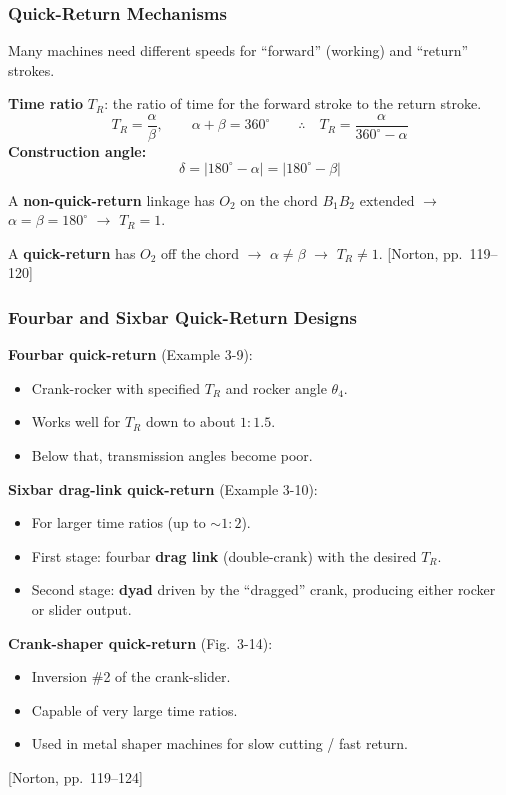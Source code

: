 \documentclass[10pt,aspectratio=43]{beamer}
\newcommand{\pref}[1]{\vfill\hfill{\scriptsize\color{gray}[Norton, pp.~#1]}}
\begin{document}

\begin{frame}
\frametitle{Quick-Return Mechanisms}

Many machines need different speeds for ``forward'' (working) and ``return'' strokes.

\begin{yellowbox}
\textbf{Time ratio} $T_R$: the ratio of time for the forward stroke to the return stroke.
\[
  T_R = \frac{\alpha}{\beta}, \qquad \alpha + \beta = 360^\circ \qquad \therefore\quad T_R = \frac{\alpha}{360^\circ - \alpha} \tag{3.1}
\]
\textbf{Construction angle:}
\[
  \delta = |180^\circ - \alpha| = |180^\circ - \beta| \tag{3.2}
\]
\end{yellowbox}

\vspace{4pt}
A \textbf{non-quick-return} linkage has $O_2$ on the chord $B_1B_2$ extended $\to$ $\alpha = \beta = 180^\circ$ $\to$ $T_R = 1$.

A \textbf{quick-return} has $O_2$ off the chord $\to$ $\alpha \neq \beta$ $\to$ $T_R \neq 1$.
\pref{119--120}
\end{frame}

\begin{frame}
\frametitle{Fourbar and Sixbar Quick-Return Designs}

\textbf{Fourbar quick-return} (Example 3-9):
\begin{itemize}
  \item Crank-rocker with specified $T_R$ and rocker angle $\theta_4$.
  \item Works well for $T_R$ down to about $1{:}1.5$.
  \item Below that, transmission angles become poor.
\end{itemize}

\vspace{6pt}
\textbf{Sixbar drag-link quick-return} (Example 3-10):
\begin{itemize}
  \item For larger time ratios (up to $\sim 1{:}2$).
  \item First stage: fourbar \textbf{drag link} (double-crank) with the desired $T_R$.
  \item Second stage: \textbf{dyad} driven by the ``dragged'' crank, producing either rocker or slider output.
\end{itemize}

\vspace{4pt}
\textbf{Crank-shaper quick-return} (Fig.~3-14):
\begin{itemize}
  \item Inversion \#2 of the crank-slider.
  \item Capable of very large time ratios.
  \item Used in metal shaper machines for slow cutting / fast return.
\end{itemize}
\pref{119--124}
\end{frame}
\end{document}
